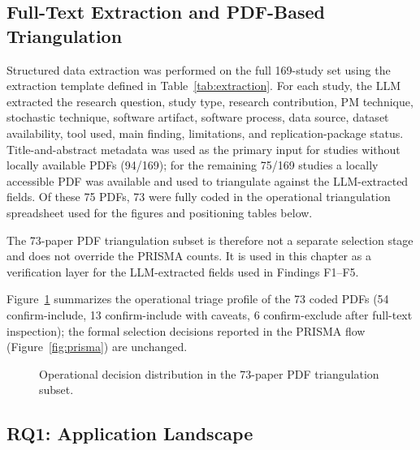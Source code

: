 \subsection{Full-Text Extraction and PDF-Based Triangulation}
\label{sec:slr-pdf-enrichment}

Structured data extraction was performed on the full 169-study set using the
extraction template defined in Table~\ref{tab:extraction}. For each study,
the LLM extracted the research question, study type, research contribution,
PM technique, stochastic technique, software artifact, software process, data
source, dataset availability, tool used, main finding, limitations, and
replication-package status. Title-and-abstract metadata was used as the
primary input for studies without locally available PDFs (94/169); for the
remaining 75/169 studies a locally accessible PDF was available and used to
triangulate against the LLM-extracted fields. Of these 75 PDFs, 73 were
fully coded in the operational triangulation spreadsheet used for the
figures and positioning tables below.

The 73-paper PDF triangulation subset is therefore not a separate selection
stage and does not override the PRISMA counts. It is used in this chapter as
a verification layer for the LLM-extracted fields used in Findings F1--F5.

Figure~\ref{fig:pdf-decision-dist} summarizes the operational triage profile
of the 73 coded PDFs (54 confirm-include, 13 confirm-include with
caveats, 6 confirm-exclude after full-text inspection); the formal selection
decisions reported in the PRISMA flow (Figure~\ref{fig:prisma}) are
unchanged.

\begin{figure}[tbp]
\centering
{}
\caption{Operational decision distribution in the 73-paper PDF triangulation subset.}
\label{fig:pdf-decision-dist}
\end{figure}

\subsection{RQ1: Application Landscape}
\label{sec:slr-rq1}

